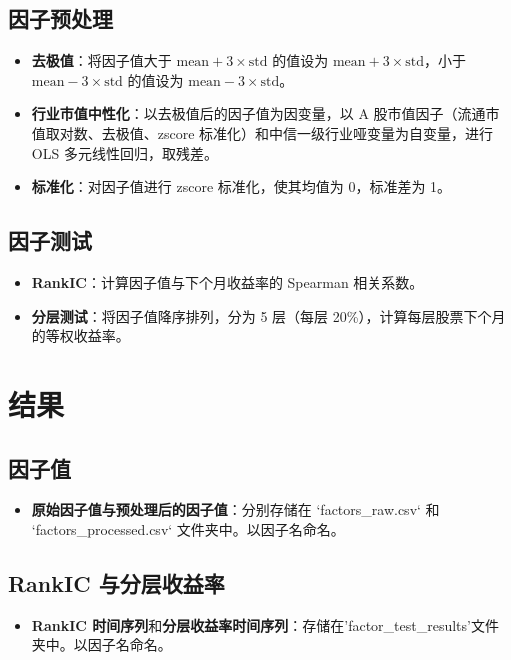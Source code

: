 \documentclass[a4paper]{article}
\begin{document}
\subsection{因子预处理}
\begin{itemize}
    \item \textbf{去极值}：将因子值大于 \( \text{mean} + 3 \times \text{std} \) 的值设为 \( \text{mean} + 3 \times \text{std} \)，小于 \( \text{mean} - 3 \times \text{std} \) 的值设为 \( \text{mean} - 3 \times \text{std} \)。
    \item \textbf{行业市值中性化}：以去极值后的因子值为因变量，以 A 股市值因子（流通市值取对数、去极值、zscore 标准化）和中信一级行业哑变量为自变量，进行 OLS 多元线性回归，取残差。
    \item \textbf{标准化}：对因子值进行 zscore 标准化，使其均值为 0，标准差为 1。
\end{itemize}

\subsection{因子测试}
\begin{itemize}
    \item \textbf{RankIC}：计算因子值与下个月收益率的 Spearman 相关系数。
    \item \textbf{分层测试}：将因子值降序排列，分为 5 层（每层 20\%），计算每层股票下个月的等权收益率。
\end{itemize}

\section{结果}

\subsection{因子值}
\begin{itemize}
    \item \textbf{原始因子值与预处理后的因子值}：分别存储在 `factors\_raw.csv` 和 `factors\_processed.csv` 文件夹中。以因子名命名。
\end{itemize}

\subsection{RankIC 与分层收益率}
\begin{itemize}
    \item \textbf{RankIC 时间序列}和\textbf{分层收益率时间序列}：存储在'factor\_test\_results'文件夹中。以因子名命名。
\end{itemize}
\end{document}
